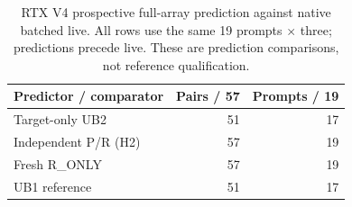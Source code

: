 \begin{table}[t]
\caption{RTX V4 prospective full-array prediction against native batched live. All rows use the same 19 prompts $\times$ three; predictions precede live. These are prediction comparisons, not reference qualification.}
\label{tab:rtxv4trajectory}
\centering
\begin{tabular}{@{}lrr@{}}
\toprule
Predictor / comparator & Pairs / 57 & Prompts / 19 \\
\midrule
Target-only UB2 & 51 & 17 \\
Independent P/R (H2) & 57 & 19 \\
Fresh R\_ONLY & 57 & 19 \\
UB1 reference & 51 & 17 \\
\bottomrule
\end{tabular}
\end{table}
